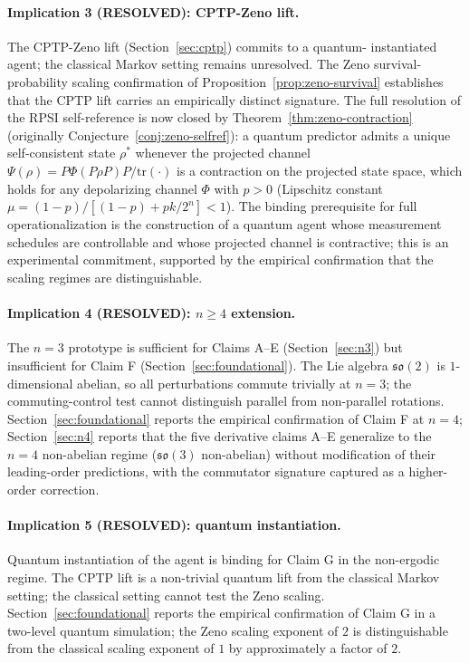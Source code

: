 \documentclass[11pt,a4paper]{article}
\theoremstyle{plain}
\theoremstyle{definition}
\theoremstyle{remark}
\newcommand{\so}{\mathfrak{so}}
\begin{document}
\paragraph{Implication 3 (RESOLVED): CPTP-Zeno lift.}
The CPTP-Zeno lift (Section~\ref{sec:cptp}) commits to a quantum-
instantiated agent; the classical Markov setting remains unresolved.
The Zeno survival-probability scaling confirmation of
Proposition~\ref{prop:zeno-survival} establishes that the CPTP lift
carries an empirically distinct signature. The full resolution of
the RPSI self-reference is now closed by
Theorem~\ref{thm:zeno-contraction} (originally
Conjecture~\ref{conj:zeno-selfref}): a quantum predictor admits a
unique self-consistent state $\rho^*$ whenever the projected channel
$\Psi(\rho)=P\Phi(P\rho P)P/\mathrm{tr}(\cdot)$ is a contraction on
the projected state space, which holds for any depolarizing channel
$\Phi$ with $p>0$ (Lipschitz constant
$\mu=(1-p)/[(1-p)+pk/2^{n}]<1$). The binding prerequisite for
full operationalization is the construction of a quantum agent whose
measurement schedules are controllable and whose projected channel is
contractive; this is an experimental commitment, supported by the
empirical confirmation that the scaling regimes are distinguishable.

\paragraph{Implication 4 (RESOLVED): $n\geq 4$ extension.}
The $n=3$ prototype is sufficient for Claims A--E
(Section~\ref{sec:n3}) but insufficient for Claim F
(Section~\ref{sec:foundational}). The Lie algebra $\so(2)$ is
$1$-dimensional abelian, so all perturbations commute trivially at
$n=3$; the commuting-control test cannot distinguish parallel from
non-parallel rotations. Section~\ref{sec:foundational} reports the
empirical confirmation of Claim F at $n=4$; Section~\ref{sec:n4}
reports that the five derivative claims A--E generalize to the $n=4$
non-abelian regime ($\so(3)$ non-abelian) without modification of their
leading-order predictions, with the commutator signature captured as a
higher-order correction.

\paragraph{Implication 5 (RESOLVED): quantum instantiation.}
Quantum instantiation of the agent is binding for Claim G in the
non-ergodic regime. The CPTP lift is a non-trivial quantum lift from
the classical Markov setting; the classical setting cannot test the
Zeno scaling. Section~\ref{sec:foundational} reports the empirical
confirmation of Claim G in a two-level quantum simulation; the Zeno
scaling exponent of $2$ is distinguishable from the classical scaling
exponent of $1$ by approximately a factor of $2$.
\end{document}
